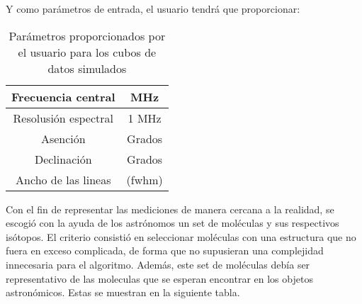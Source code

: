 Y como parámetros de entrada, el usuario tendrá que proporcionar:

\begin {table}[H]
\begin{center}
	\begin{tabular}{|c|c|}
		\hline Frecuencia central &  MHz \\ 
		\hline Resolusión espectral & 1 MHz \\ 
		\hline Asención &  Grados \\ 
		\hline Declinación & Grados \\ 
		\hline Ancho de las lineas & (fwhm) \\ 
		\hline 
	\end{tabular}
	\caption {Parámetros proporcionados por el usuario para los cubos de datos simulados}
\end{center}
\end{table}

Con el fin de representar las mediciones de manera cercana a la realidad, se escogió con la ayuda de los astrónomos un set de moléculas y sus respectivos isótopos. El criterio consistió en seleccionar moléculas con una estructura que no fuera en exceso complicada, de forma que no supusieran una complejidad innecesaria para el algoritmo. Además, este set de moléculas debía ser representativo de las moleculas que se esperan encontrar en los objetos astronómicos. Estas se muestran en la siguiente tabla.

